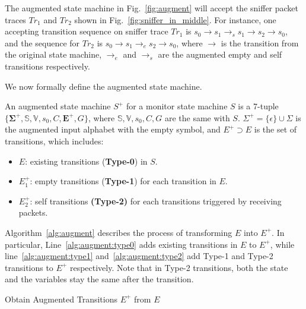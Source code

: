 The augmented state machine in Fig.~\ref{fig:augment} will accept the sniffer
packet traces $Tr_1$ and $Tr_2$ shown in Fig.~\ref{fig:sniffer_in_middle}.  For
instance, one accepting transition sequence on sniffer trace $Tr_1$ is
$s_0\rightarrow s_1 \rightarrow_s s_1\rightarrow s_2 \rightarrow s_0$, and the
sequence for $Tr_2$ is $s_0 \rightarrow s_1 \rightarrow_e s_2 \rightarrow s_0$,
where $\rightarrow$ is the transition from the original state machine,
$\rightarrow_e$ and $\rightarrow_s$ are the augmented empty and self transitions
respectively.

We now formally define the augmented state machine.

\begin{definition}
  An augmented state machine $S^+$ for a monitor state machine $S$ is a 7-tuple
  $\{\boldsymbol{\Sigma^+}, \mathbb{S}, \mathbb{V}, s_0, C, \boldsymbol{E^+},
  G\}$, where $\mathbb{S}, \mathbb{V}, s_0, C, G$ are the same with $S$.
  $\Sigma^+=\{\epsilon\} \cup \Sigma$ is the augmented input alphabet with the
  empty symbol, and $E^+ \supset E$ is the set of transitions, which includes:
  \begin{itemize}
    \item $E$: existing transitions (\textbf{Type-0}) in $S$.
    \item $E^+_1$: empty transitions (\textbf{Type-1}) for each transition in $E$.
    \item $E^+_2$: self transitions \textbf{(Type-2)} for each transitions
      triggered by receiving packets.
  \end{itemize}
\end{definition}

Algorithm~\ref{alg:augment} describes the process of transforming $E$ into
$E^+$.  In particular, Line~\ref{alg:augment:type0} adds existing transitions in
$E$ to $E^+$, while line~\ref{alg:augment:type1} and~\ref{alg:augment:type2} add
Type-1 and Type-2 transitions to $E^+$ respectively. Note that in Type-2
transitions, both the state and the variables stay the same after the
transition.

\begin{algorithm}[h!]
  \begin{algorithmic}[1]
      \label{alg:augment:type0}
      \label{alg:augment:type1}
        \label{alg:augment:type2}
      \EndIf
    \EndFor
    \State {}
    \EndFunction
  \end{algorithmic}
  \caption{Obtain Augmented Transitions $E^+$ from $E$}
  \label{alg:augment}
\end{algorithm}


